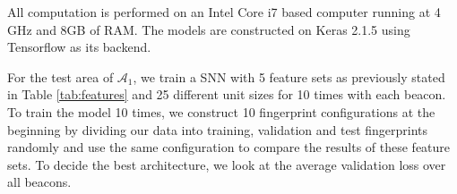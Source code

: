 \documentclass[conference]{IEEEtran}
\begin{document}
{	All computation is performed on an Intel Core i7 based computer running at 4 GHz and 8GB of RAM. The models are constructed on Keras 2.1.5 \cite{chollet2015} using Tensorflow as its backend. 
	
	For the test area of $\mathcal{A}_1$, we train a SNN with 5  feature sets as previously stated in Table \ref{tab:features} and 25 different unit sizes for 10 times with each beacon. To train the model 10 times, we construct 10 fingerprint configurations at the beginning by dividing our data into training, validation and test fingerprints randomly and use the same configuration to compare the results of these feature sets. To decide the best architecture, we look at the average validation loss over all beacons. 
	
}
\end{document}
